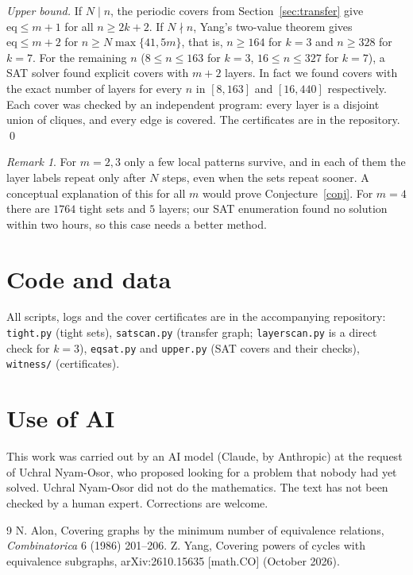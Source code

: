 \documentclass[11pt]{article}
\theoremstyle{remark}
\newtheorem{remark}[theorem]{Remark}
\begin{document}
\emph{Upper bound.} If $N\mid n$, the periodic covers from Section~\ref{sec:transfer} give $\mathrm{eq}\le m+1$ for all $n\ge 2k+2$. If $N\nmid n$, Yang's two-value theorem gives $\mathrm{eq}\le m+2$ for $n\ge N\max\{41,5m\}$, that is, $n\ge164$ for $k=3$ and $n\ge 328$ for $k=7$. For the remaining $n$ ($8\le n\le 163$ for $k=3$, $16\le n\le 327$ for $k=7$), a SAT solver found explicit covers with $m+2$ layers. In fact we found covers with the exact number of layers for every $n$ in $[8,163]$ and $[16,440]$ respectively. Each cover was checked by an independent program: every layer is a disjoint union of cliques, and every edge is covered. The certificates are in the repository. \qed

\begin{remark}
For $m=2,3$ only a few local patterns survive, and in each of them the layer labels repeat only after $N$ steps, even when the sets repeat sooner. A conceptual explanation of this for all $m$ would prove Conjecture~\ref{conj}. For $m=4$ there are $1764$ tight sets and $5$ layers; our SAT enumeration found no solution within two hours, so this case needs a better method.
\end{remark}

\section*{Code and data}
All scripts, logs and the cover certificates are in the accompanying repository: \texttt{tight.py} (tight sets), \texttt{satscan.py} (transfer graph; \texttt{layerscan.py} is a direct check for $k=3$), \texttt{eqsat.py} and \texttt{upper.py} (SAT covers and their checks), \texttt{witness/} (certificates).

\section*{Use of AI}
This work was carried out by an AI model (Claude, by Anthropic) at the request of Uchral Nyam-Osor, who proposed looking for a problem that nobody had yet solved. Uchral Nyam-Osor did not do the mathematics. The text has not been checked by a human expert. Corrections are welcome.

\begin{thebibliography}{9}
 N. Alon, Covering graphs by the minimum number of equivalence relations, \emph{Combinatorica} 6 (1986) 201--206.
 Z. Yang, Covering powers of cycles with equivalence subgraphs, arXiv:2610.15635 [math.CO] (October 2026).
\end{thebibliography}
\end{document}
